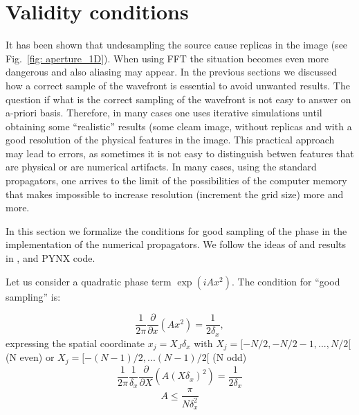 \documentclass{iucr}              %
\begin{document}
\section{Validity conditions}
\label{ch: validity}

It has been shown that undesampling the source cause replicas in the image (see Fig.~\ref{fig: aperture_1D}). When using FFT the situation becomes even more dangerous and also aliasing may appear. In the previous sections we discussed how a correct sample of the wavefront is essential to avoid unwanted results. The question if what is the correct sampling of the wavefront is not easy to answer on a-priori basis. Therefore, in many cases one uses iterative simulations until obtaining some ``realistic'' results (some cleam image, without replicas and with a good resolution of the physical features in the image. This practical approach may lead to errors, as sometimes it is not easy to distinguish betwen features that are physical or are numerical artifacts. In many cases, using the standard propagators, one arrives to the limit of the possibilities of the computer memory that makes impossible to increase resolution (increment the grid size) more and more.

In this section we formalize the conditions for good sampling of the phase in the implementation of the numerical propagators. We follow the ideas of \cite{goodmanfourier} and results in \cite{schmidt}, \cite{pirro} and PYNX code.  

Let us consider a quadratic phase term $\exp(i A x^2)$. The condition for ``good sampling'' is:

\begin{equation}
\frac{1}{2 \pi} \frac{\partial}{\partial x}(A x^2) = \frac{1}{2 \delta_x},
\end{equation}
expressing the spatial coordinate $x_j=X_J \delta_x$ with $X_j = [-N/2,-N/2 -1, ..., N/2[$ (N even) or $X_j = [-(N-1)/2,...(N-1)/2[$ (N odd)
\begin{equation}
\frac{1}{2 \pi} \frac{1}{\delta_x} \frac{\partial}{\partial X}(A (X \delta_x)^2) = \frac{1}{2 \delta_x}
\end{equation}
\begin{equation}\label{eq: good sampling condition}
A \leq \frac{\pi}{N \delta_x^2}
\end{equation}
\end{document}
